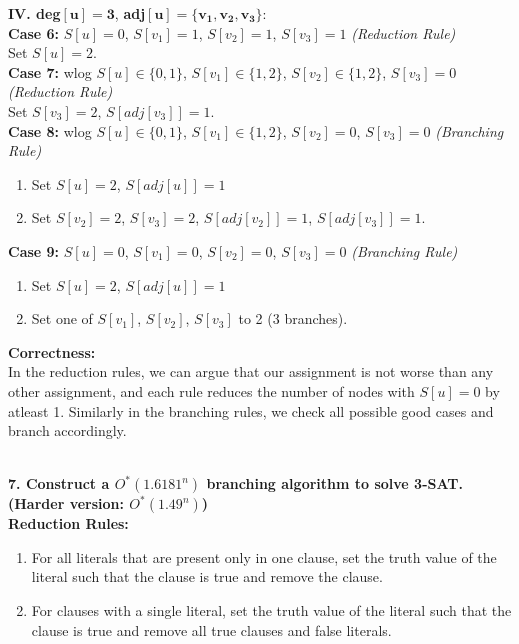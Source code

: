 \documentclass{article}
\begin{document}
\noindent
\textbf{IV. deg}$\mathbf{[u] = 3}$, \textbf{adj}$\mathbf{[u] = \{v_1, v_2, v_3\}}$: \\
\textbf{Case 6:} $S[u] = 0$, $S[v_1] = 1$, $S[v_2] = 1$, $S[v_3] = 1$ \textit{(Reduction Rule)} \\
\hspace*{2em} Set $S[u] = 2$. \\
\textbf{Case 7:} wlog $S[u] \in \{0, 1\}$, $S[v_1] \in \{1, 2\}$, $S[v_2] \in \{1, 2\}$, $S[v_3] = 0$ \textit{(Reduction Rule)} \\ 
\hspace*{2em} Set $S[v_3] = 2$, $S[adj[v_3]] = 1$. \\
\textbf{Case 8:} wlog $S[u] \in \{0, 1\}$, $S[v_1] \in \{1, 2\}$, $S[v_2] = 0$, $S[v_3] = 0$ \textit{(Branching Rule)} \vspace*{-1ex}
\begin{enumerate}[label=(\alph*)]
    \itemindent2em
    \itemsep0em
    \item Set $S[u] = 2$, $S[adj[u]] = 1$
    \item Set $S[v_2] = 2$, $S[v_3] = 2$, $S[adj[v_2]] = 1$, $S[adj[v_3]] = 1$.
\end{enumerate} \vspace*{-1ex}
\textbf{Case 9:} $S[u] = 0$, $S[v_1] = 0$, $S[v_2] = 0$, $S[v_3] = 0$ \textit{(Branching Rule)} \vspace*{-1ex}
\begin{enumerate}[label=(\alph*)]
    \itemindent2em
    \itemsep0em
    \item Set $S[u] = 2$, $S[adj[u]] = 1$
    \item Set one of $S[v_1]$, $S[v_2]$, $S[v_3]$ to 2 (3 branches).
\end{enumerate}

\noindent
\textbf{Correctness:} \\
In the reduction rules, we can argue that our assignment is not worse than any other assignment, and each rule reduces the number of nodes with $S[u] = 0$ by atleast 1. Similarly in the branching rules, we check all possible good cases and branch accordingly. 


\,\\

\noindent
\textbf{7. Construct a $O^*(1.6181^n)$ branching algorithm to solve 3-SAT. (Harder version: $O^*(1.49^n)$)} \\

\noindent
\textbf{Reduction Rules:}
\begin{enumerate}
    \item For all literals that are present only in one clause, set the truth value of the literal such that the clause is true and remove the clause.
    \item For clauses with a single literal, set the truth value of the literal such that the clause is true and remove all true clauses and false literals.
\end{enumerate}
\end{document}
